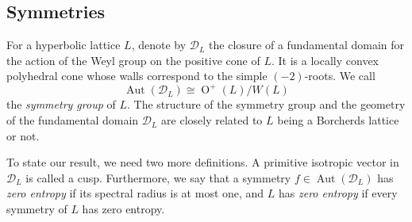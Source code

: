 \documentclass[11pt,letterpaper]{amsart}
\DeclareMathOperator{\Aut}{Aut}
\DeclareMathOperator{\Pic}{Pic}
\DeclareMathOperator{\Or}{O}
\begin{document}

\subsection{Symmetries}
For a hyperbolic lattice $L$, denote by $\mathcal{D}_L$ the closure of a fundamental domain for the action of the Weyl group on the positive cone of $L$. It is a locally convex polyhedral cone whose walls correspond to the simple $(-2)$-roots.
We call 
\[\Aut(\mathcal{D}_L)\cong \Or^+(L)/W(L)\] 
the \emph{symmetry group} of $L$. The structure of the symmetry group and the geometry of the fundamental domain $\mathcal{D}_L$ are closely related to $L$ being a Borcherds lattice or not.  

To state our result, we need two more definitions.
A primitive isotropic vector in $\mathcal{D}_L$ is called a cusp.
Furthermore, we say that a symmetry $f\in \Aut(\mathcal{D}_L)$ has \emph{zero entropy} if its spectral radius is at most one, and $L$ has \emph{zero entropy} if every symmetry of $L$ has zero entropy.
\end{document}
